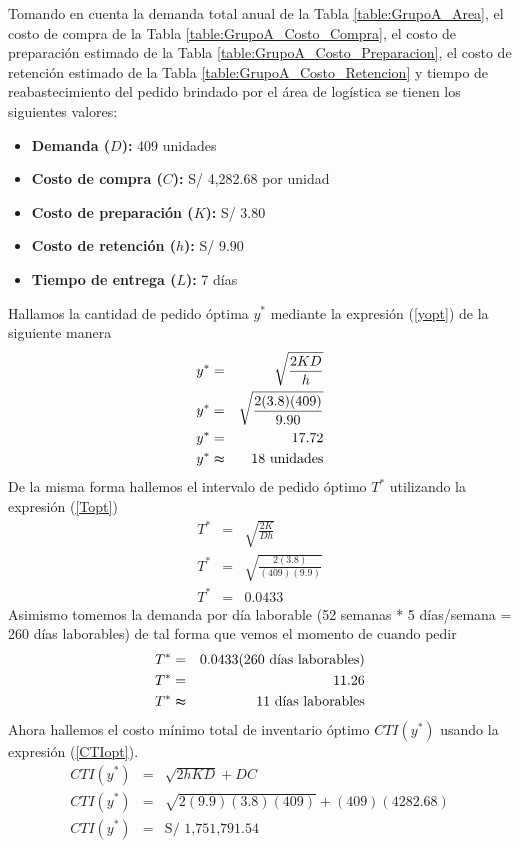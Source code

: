Tomando en cuenta la demanda total anual de la Tabla \ref{table:GrupoA_Area}, el costo de compra de la Tabla \ref{table:GrupoA_Costo_Compra}, el costo de preparación estimado de la Tabla \ref{table:GrupoA_Costo_Preparacion}, el costo de retención estimado de la Tabla \ref{table:GrupoA_Costo_Retencion} y tiempo de reabastecimiento del pedido brindado por el área de logística se tienen los siguientes valores:
\begin{itemize}
    \item \textbf{Demanda ($D$):} 409 unidades
    \item \textbf{Costo de compra ($C$):} S/ 4,282.68 por unidad
    \item \textbf{Costo de preparación ($K$):} S/ 3.80
    \item \textbf{Costo de retención ($h$):} S/ 9.90
    \item \textbf{Tiempo de entrega ($L$):} 7 días
\end{itemize}
Hallamos la cantidad de pedido óptima $y^*$ mediante la expresión (\ref{yopt}) de la siguiente manera
\begin{eqnarray}
    y^* &=& \sqrt{\frac{2KD}{h}} \nonumber \\
    y^* &=& \sqrt{\frac{2(3.8)(409)}{9.90}} \nonumber \\
    y^* &=& 17.72 \nonumber \\
    y^* &\thickapprox& 18 \text{ unidades} \nonumber
\end{eqnarray}
De la misma forma hallemos el intervalo de pedido óptimo $T^*$ utilizando la expresión (\ref{Topt}) 
\begin{eqnarray}
    T^* &=& \sqrt{\frac{2K}{Dh}} \nonumber \\
    T^* &=& \sqrt{\frac{2(3.8)}{(409)(9.9)}} \nonumber \\
    T^* &=& 0.0433 \nonumber
\end{eqnarray}
Asimismo tomemos la demanda por día laborable (52 semanas * 5 días/semana = 260 días laborables) de tal forma que vemos el momento de cuando pedir
\begin{eqnarray}
    T^* &=& 0.0433 (260 \text{ días laborables}) \nonumber \\   
    T^* &=& 11.26 \nonumber \\
    T^* &\thickapprox& 11 \text{ días laborables} \nonumber
\end{eqnarray}
Ahora hallemos el costo mínimo total de inventario óptimo $CTI(y^*)$ usando la expresión (\ref{CTIopt}).
\begin{eqnarray}
    CTI(y^*) &=& \sqrt{2hKD} + DC \nonumber \\
    CTI(y^*) &=& \sqrt{2(9.9)(3.8)(409)} + (409)(4282.68) \nonumber \\
    CTI(y^*) &=& \text{S/ 1,751,791.54} \nonumber
\end{eqnarray}
